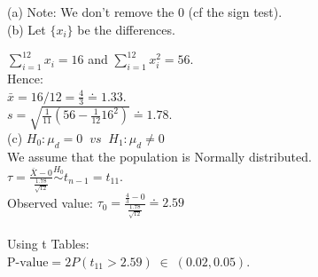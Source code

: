\documentclass[bigtut]{tutorial}\usepackage[]{graphicx}\usepackage[]{color}
\makeatletter
\newcommand{\hlstd}[1]{\textcolor[rgb]{0.345,0.345,0.345}{#1}}%
\newcommand{\hlkwd}[1]{\textcolor[rgb]{0.737,0.353,0.396}{\textbf{#1}}}%
\newenvironment{kframe}{%
 \def\at@end@of@kframe{}%
 \ifinner\ifhmode%
  \def\at@end@of@kframe{\end{minipage}}%
  \begin{minipage}{\columnwidth}%
 \fi\fi%
 \def\FrameCommand##1{\hskip\@totalleftmargin \hskip-\fboxsep
 \colorbox{shadecolor}{##1}\hskip-\fboxsep
     \hskip-\linewidth \hskip-\@totalleftmargin \hskip\columnwidth}%
 \MakeFramed {\advance\hsize-\width
   \@totalleftmargin\z@ \linewidth\hsize
   \@setminipage}}%
 {\par\unskip\endMakeFramed%
 \at@end@of@kframe}
\newenvironment{knitrout}{}{} %
\makeatother
\begin{document}
\begin{tutorial}
\begin{questions}


\begin{solution}
\vspace{1cm}
(a) Note: We don't remove the 0 (cf the sign test). \\

(b)
Let $\{ x_{i} \}$ be the differences.

$\sum_{i=1}^{12} x_{i} = 16$ and $\sum_{i=1}^{12} x_{i}^2 = 56$. \\

Hence: \\
$\bar{x} = 16/12 = \frac{4}{3} \doteq 1.33$. \\
$s= \sqrt{ \frac{1}{11} (  56 - \frac{1}{12} 16^2 )} \doteq 1.78$. \\

(c)  
$H_0: \mu_{d}=0  \;\; vs \;\; H_1: \mu_{d} \neq 0$ \\

We assume that the population is Normally distributed. \\

$\tau = \frac{ \bar{X} - 0 }{ \frac{1.78}{\sqrt{12}}   }   \overset{H_0}{\sim}  t_{n-1} = t_{11}$. \\
Observed value: $\tau_{0} = \frac{ \frac{4}{3}-0}{\frac{1.78}{\sqrt{12}} }  \doteq  2.59 $ \\


 \\

Using t Tables: \\
$\text{P-value} = 2 P( t_{11} >  2.59 ) \; \in \; (0.02,0.05)$. \\


\end{solution}
\end{questions}
\end{tutorial}
\end{document}
